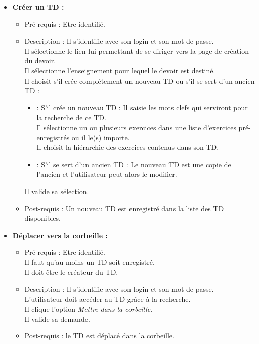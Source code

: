 \begin{itemize}
\item {\bf Cr{\'e}er un TD :}
	\begin{itemize}
	\item Pr{\'e}-requis : Etre identifi{\'e}.
	\item Description : Il s'identifie avec son login et son mot de passe.\\
	Il s{\'e}lectionne le lien lui permettant de se diriger vers la page de cr{\'e}ation du devoir.\\
	Il s{\'e}lectionne l'enseignement pour lequel le devoir est destin{\'e}.\\
	Il choisit s'il cr{\'e}e compl{\'e}tement un nouveau TD ou s'il se sert d'un ancien TD :
	\begin{itemize}
		\item : S'il cr{\'e}e un nouveau TD : Il saisie les mots clefs qui serviront pour la recherche de ce TD.\\
		Il s{\'e}lectionne un ou plusieurs exercices dans une liste d'exercices pr{\'e}-enregistr{\'e}s ou il le(s) importe.\\
		Il choisit la hi{\'e}rarchie des exercices contenus dans son TD.
		\item : S'il se sert d'un ancien TD : Le nouveau TD est une copie de l'ancien et l'utilisateur peut alors le modifier.
	\end{itemize}
	Il valide sa s{\'e}lection.
	\item Post-requis : Un nouveau TD est enregistr{\'e} dans la liste des TD disponibles.\\
	\end{itemize}

\item {\bf D{\'e}placer vers la corbeille :}
	\begin{itemize}
	\item Pr{\'e}-requis : Etre identifi{\'e}.\\
	Il faut qu'au moins un TD soit enregistr{\'e}.\\
	Il doit {\^e}tre le cr{\'e}ateur du TD.
	\item Description : Il s'identifie avec son login et son mot de passe.\\
	L'utilisateur doit acc{\'e}der au TD gr{\^a}ce {\`a} la recherche.\\
	Il clique l'option {\it Mettre dans la corbeille}.\\
	Il valide sa demande.
	\item Post-requis : le TD est d{\'e}plac{\'e} dans la corbeille.\\
	\end{itemize}

\end{itemize}


